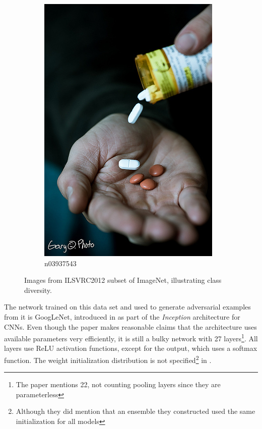 \documentclass[11pt, a4paper]{article}
\begin{document}
\begin{figure}[htb]
\begin{subfigure}[b]{0.30\textwidth}
        \includegraphics[width=\textwidth]{imagenet/examples/n03937543_10012.JPEG}
        \caption{n03937543}
        \label{fig:imagenet-examples-6}
    \end{subfigure}
    \caption{Images from ILSVRC2012 subset of ImageNet, illustrating class diversity.}
    \label{fig:imagenet-examples}
\end{figure}

The network trained on this data set and used to generate adversarial examples from it is GoogLeNet, introduced in \cite{going-deeper-with-convolutions} as part of the \emph{Inception} architecture for CNNs. Even though the paper makes reasonable claims that the architecture uses available parameters very efficiently, it is still a bulky network with 27 layers\footnote{The paper mentions 22, not counting pooling layers since they are parameterless}. All layers use ReLU activation functions, except for the output, which uses a softmax function. The weight initialization distribution is not specified\footnote{Although they did mention that an ensemble they constructed used the same initialization for all models} in \cite{going-deeper-with-convolutions}.
\end{document}
